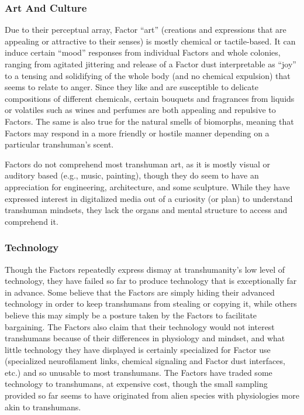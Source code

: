 \subsubsection{Art And Culture }

Due to their perceptual array, Factor ``art'' (creations 
and expressions that are appealing or attractive to 
their senses) is mostly chemical or tactile-based. It 
can induce certain ``mood'' responses from individual 
Factors and whole colonies, ranging from agitated 
jittering and release of a Factor dust interpretable as 
``joy'' to a tensing and solidifying of the whole body 
(and no chemical expulsion) that seems to relate to 
anger. Since they like and are susceptible to delicate 
compositions of different chemicals, certain bouquets 
and fragrances from liquids or volatiles such as wines 
and perfumes are both appealing and repulsive to 
Factors. The same is also true for the natural smells 
of biomorphs, meaning that Factors may respond in 
a more friendly or hostile manner depending on a 
particular transhuman's scent.

Factors do not comprehend most transhuman art, 
as it is mostly visual or auditory based (e.g., music, 
painting), though they do seem to have an appreciation
for engineering, architecture, and some sculpture.
While they have expressed interest in digitalized media 
out of a curiosity (or plan) to understand transhuman 
mindsets, they lack the organs and mental structure to 
access and comprehend it. 

\subsubsection{Technology}

Though the Factors repeatedly express dismay at 
transhumanity's low level of technology, they have 
failed so far to produce technology that is exceptionally
far in advance. Some believe that the Factors are
simply hiding their advanced technology in order to 
keep transhumans from stealing or copying it, while 
others believe this may simply be a posture taken 
by the Factors to facilitate bargaining. The Factors 
also claim that their technology would not interest 
transhumans because of their differences in physiology
and mindset, and what little technology they
have displayed is certainly specialized for Factor use 
(specialized neurofilament links, chemical signaling 
and Factor dust interfaces, etc.) and so unusable to 
most transhumans. The Factors have traded some 
technology to transhumans, at expensive cost, though 
the small sampling provided so far seems to have 
originated from alien species with physiologies more 
akin to transhumans.

